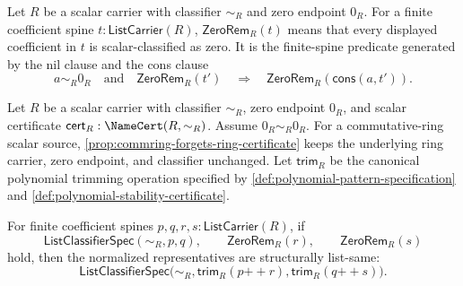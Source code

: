 \begin{definition}
\label{def:classified-zero-remainder-spine}
Let $R$ be a scalar carrier with classifier $\sim_R$ and zero endpoint $0_R$. For a finite coefficient spine $t:\mathsf{ListCarrier}(R)$, $\mathsf{ZeroRem}_R(t)$ means that every displayed coefficient in $t$ is scalar-classified as zero. It is the finite-spine predicate generated by the nil clause and the cons clause
$$
a\sim_R0_R
\quad\text{and}\quad
\mathsf{ZeroRem}_R(t')
\quad\Longrightarrow\quad
\mathsf{ZeroRem}_R(\mathsf{cons}(a,t')).
$$
\end{definition}

\begin{lemma}
\label{lem:trim-invariance-common-classified-spine-zero-remainders}
Let $R$ be a scalar carrier with classifier $\sim_R$, zero endpoint $0_R$, and scalar certificate $\mathsf{cert}_R:\NameCert(R,\sim_R)$. Assume $0_R\sim_R0_R$. For a commutative-ring scalar source, \autoref{prop:commring-forgets-ring-certificate} keeps the underlying ring carrier, zero endpoint, and classifier unchanged. Let $\mathsf{trim}_R$ be the canonical polynomial trimming operation specified by \autoref{def:polynomial-pattern-specification} and \autoref{def:polynomial-stability-certificate}.

For finite coefficient spines $p,q,r,s:\mathsf{ListCarrier}(R)$, if
$$
\mathsf{ListClassifierSpec}(\sim_R,p,q),
\qquad
\mathsf{ZeroRem}_R(r),
\qquad
\mathsf{ZeroRem}_R(s)
$$
hold, then the normalized representatives are structurally list-same:
$$
\mathsf{ListClassifierSpec}\bigl(\sim_R,\mathsf{trim}_R(p{++}r),\mathsf{trim}_R(q{++}s)\bigr).
$$
\end{lemma}
